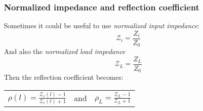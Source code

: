 \subsubsection*{Normalized impedance and reflection coefficient}
Sometimes it could be useful to use \emph{normalized input impedance}:
\begin{equation}
    \mathcal{Z}_i =\frac{Z_i}{Z_0}
\end{equation}
And also the \emph{normalized load impedance}
\begin{equation}
    \mathcal{Z}_L =\frac{Z_L}{Z_0}
\end{equation}
Then the reflection coefficient becomes:
\begin{center}
    \begin{tabular}{ c c c }
        $\rho(l)=\frac{\mathcal{Z}_i(l)-1}{\mathcal{Z}_i(l)+1}$&
        and&
        $\rho_L=\frac{\mathcal{Z}_L-1}{\mathcal{Z}_L+1}$
    \end{tabular}
\end{center}
